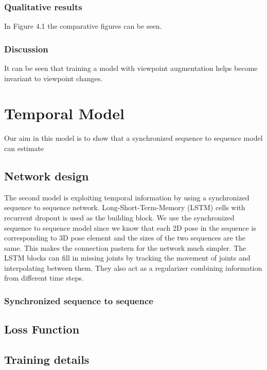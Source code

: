 \subsubsection{Qualitative results}

In Figure 4.1 the comparative figures can be seen. 

\subsubsection{Discussion}

It can be seen that training a model with viewpoint augmentation helps become invariant to viewpoint changes.


\section{Temporal Model}

Our aim in this model is to show that a synchronized sequence to sequence model can estimate 

\subsection{Network design}

The second model is exploiting temporal information by using a synchronized sequence to sequence network. Long-Short-Term-Memory (LSTM) \parencite{hochreiter1997long} cells with recurrent dropout \parencite{semeniuta2016recurrent} is used as the building block. We use the synchronized sequence to sequence model since we know that each 2D pose in the sequence is corresponding to 3D pose element and the sizes of the two sequences are the same. This makes the connection pastern for the network much simpler. The LSTM blocks can fill in missing joints by tracking the movement of joints and interpolating between them. They also act as a regularizer combining information from different time steps.


\subsubsection{Synchronized sequence to sequence}
\subsection{Loss Function}
\subsection{Training details}
